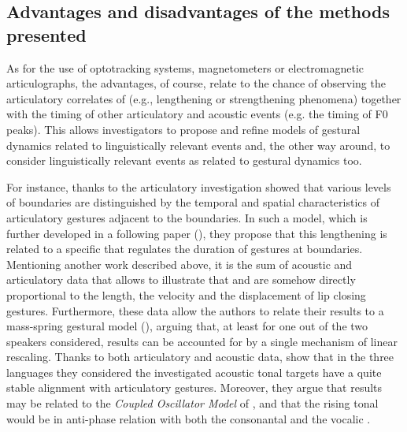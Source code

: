 \documentclass[output=paper]{langsci/langscibook}
\begin{document}
\subsection{Advantages and disadvantages of the methods presented}\label{sec:gil:2:3}\largerpage
As for the use of optotracking systems, magnetometers or electromagnetic articulographs, the advantages, of course, relate to the chance of observing the articulatory correlates of  (e.g., lengthening or strengthening phenomena) together with the timing of other articulatory and acoustic events (e.g. the timing of F0 peaks). This allows investigators to propose and refine models of gestural dynamics related to linguistically relevant  events and, the other way around, to consider linguistically relevant  events as related to gestural dynamics too.

For instance, thanks to the articulatory investigation \citet{Byrd1998} showed that various levels of  boundaries are distinguished by the temporal and spatial characteristics of articulatory gestures adjacent to the boundaries. In such a model, which is further developed in a following paper (\citealt{Byrd2003}), they propose that this lengthening is related to a specific   that regulates the duration of gestures at  boundaries. Mentioning another work described above, it is the sum of acoustic and articulatory data that allows \citet{Avesani2007} to illustrate that  and   are somehow directly proportional to the length, the velocity and the displacement of lip closing gestures. Furthermore, these data allow the authors to relate their results to a mass-spring gestural model (\citealt{Browman1995,Fowler1995,Saltzman1995,Saltzman1989}), arguing that, at least for one out of the two speakers considered, results can be accounted for by a single mechanism of linear rescaling. Thanks to both articulatory and acoustic data, \citet{Stella2014} show that in the three languages they considered the investigated acoustic tonal targets have a quite stable alignment with articulatory gestures. Moreover, they argue that results may be related to the \textit{Coupled Oscillator Model} of  \citep{Goldstein2009}, and that the rising tonal  would be in anti-phase relation with both the consonantal and the vocalic .
\end{document}
